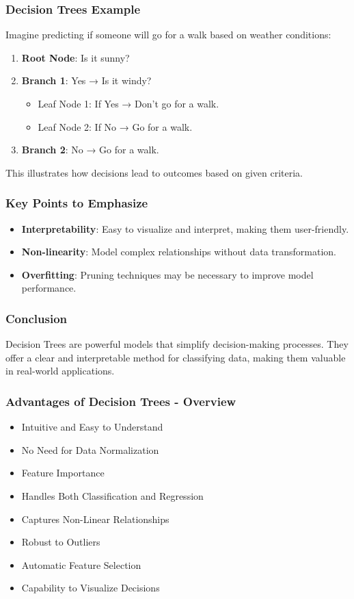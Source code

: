 \documentclass[aspectratio=169]{beamer}
\begin{document}
\begin{frame}[fragile]
    \frametitle{Decision Trees Example}
    Imagine predicting if someone will go for a walk based on weather conditions:
    \begin{enumerate}
        \item \textbf{Root Node}: Is it sunny?
        \item \textbf{Branch 1}: Yes → Is it windy?
            \begin{itemize}
                \item Leaf Node 1: If Yes → Don't go for a walk.
                \item Leaf Node 2: If No → Go for a walk.
            \end{itemize}
        \item \textbf{Branch 2}: No → Go for a walk.
    \end{enumerate}
    This illustrates how decisions lead to outcomes based on given criteria.
\end{frame}

\begin{frame}[fragile]
    \frametitle{Key Points to Emphasize}
    \begin{itemize}
        \item \textbf{Interpretability}: Easy to visualize and interpret, making them user-friendly.
        \item \textbf{Non-linearity}: Model complex relationships without data transformation.
        \item \textbf{Overfitting}: Pruning techniques may be necessary to improve model performance.
    \end{itemize}
\end{frame}

\begin{frame}[fragile]
    \frametitle{Conclusion}
    Decision Trees are powerful models that simplify decision-making processes. 
    They offer a clear and interpretable method for classifying data, making them valuable in real-world applications.
\end{frame}

\begin{frame}[fragile]
    \frametitle{Advantages of Decision Trees - Overview}
    \begin{itemize}
        \item Intuitive and Easy to Understand
        \item No Need for Data Normalization
        \item Feature Importance
        \item Handles Both Classification and Regression
        \item Captures Non-Linear Relationships
        \item Robust to Outliers
        \item Automatic Feature Selection
        \item Capability to Visualize Decisions
    \end{itemize}
\end{frame}
\end{document}
